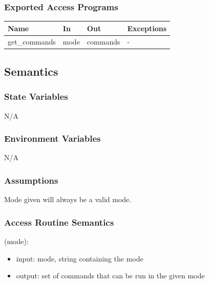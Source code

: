 \documentclass[12pt, titlepage]{article}
\begin{document}
\subsubsection{Exported Access Programs}

\begin{center}
\begin{tabular}{p{3cm} p{4cm} p{4cm} p{2cm}}
\hline
\textbf{Name} & \textbf{In} & \textbf{Out} & \textbf{Exceptions} \\
\hline
{get\_commands} & mode & commands & - \\
\hline
\end{tabular}
\end{center}

\subsection{Semantics}

\subsubsection{State Variables}

N/A
\subsubsection{Environment Variables}
N/A

\subsubsection{Assumptions}
Mode given will always be a valid mode.

\subsubsection{Access Routine Semantics}

(mode):
\begin{itemize}
\item input: mode, string containing the mode
\item output: set of commands that can be run in the given mode
\end{itemize}
%
%
\end{document}
